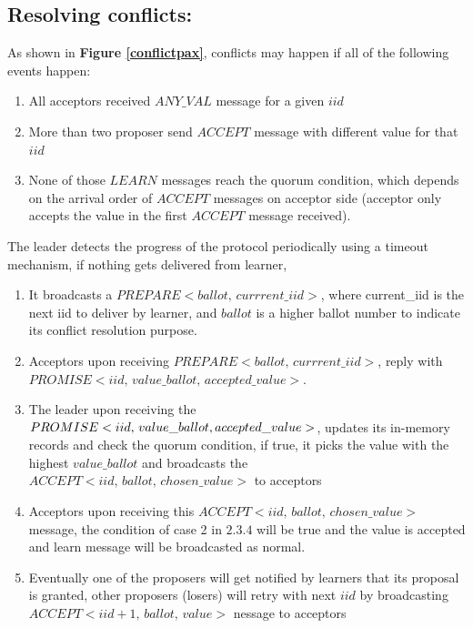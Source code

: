 \subsection{Resolving conflicts:}

As shown in \textbf{Figure \ref{conflictpax}}, conflicts may happen if all of the following events happen:

\begin{enumerate}
\item All acceptors received $ANY\_VAL$ message for a given $iid$
\item More than two proposer send $ACCEPT$ message with different value for that $iid$
\item None of those $LEARN$ messages reach the quorum condition, which depends on the arrival order of $ACCEPT$ messages on acceptor side (acceptor only accepts the value in the first $ACCEPT$ message received). 
\end{enumerate}

\noindent
The leader detects the progress of the protocol periodically using a timeout mechanism, if nothing gets delivered from learner, 
\begin{enumerate}
\item It broadcasts a $PREPARE<ballot,\,currrent\_iid>$, where current\_iid is the next iid to deliver by learner, and $ballot$ is a higher ballot number to indicate its conflict resolution purpose. 
\item Acceptors upon receiving $PREPARE<ballot,\, currrent\_iid>$, reply with $PROMISE<iid,\, value\_ballot,\, accepted\_value>$.
\item The leader upon receiving the $PROMISE<iid,\, value\_ballot,\,\\ accepted\_value>$, updates its in-memory records and check the quorum condition, if true, it picks the value with the highest $value\_ballot$ and broadcasts the $ACCEPT<iid, \, ballot,\, chosen\_value>$ to acceptors
\item Acceptors upon receiving this $ACCEPT<iid, \, ballot,\, chosen\_value>$ message, the condition of case 2 in $2.3.4$ will be true and the value is accepted and learn message will be broadcasted as normal. 
\item Eventually one of the proposers will get notified by learners that its proposal is granted, other proposers (losers) will retry with next $iid$ by broadcasting $ACCEPT<iid+1, \, ballot, \, value>$ nessage to acceptors
\end{enumerate}

